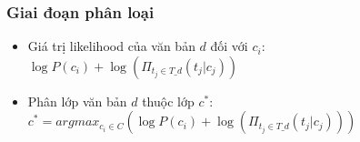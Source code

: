 \begin{frame}
  \frametitle{Giai đoạn phân loại}
  
  \begin{itemize}[<+->]
    \item Giá trị likelihood của văn bản $d$ đối với $c_{i}$: $\log{P(c_{i})} + \log{(\Pi_{t_{j} \in T\_d} (t_j | c_j))} $
    \item Phân lớp văn bản $d$ thuộc lớp $c^{*}$: $c^{*} = argmax_{c_i \in C} (\log{P(c_{i})} + \log{(\Pi_{t_{j} \in T\_d} (t_j | c_j))})$
  \end{itemize}
  
\end{frame}
